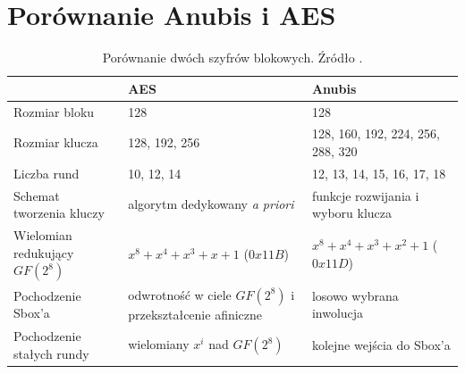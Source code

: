 \section{Porównanie Anubis i AES}

\begin{table}[!ht]
\centering
\begin{tabular}{ | L|| K| K |} 
\hline
 & AES & Anubis \\ 
\hline
\hline
Rozmiar bloku & 128 & 128 \\ 
\hline
Rozmiar klucza & 128, 192, 256 & 128, 160, 192, 224, 256, 288, 320 \\ 
\hline
Liczba rund & 10, 12, 14 & 12, 13, 14, 15, 16, 17, 18 \\ 
\hline
Schemat tworzenia kluczy & algorytm dedykowany \textit{a priori} & funkcje rozwijania i wyboru klucza \\ 
\hline
Wielomian redukujący $GF(2^8)$ & $x^8+x^4+x^3+x+1$ ($0x11B$) & $x^8+x^4+x^3+x^2+1$ ($0x11D$)\\ 
\hline
Pochodzenie Sbox'a & odwrotność w ciele $GF(2^8)$ i przekształcenie afiniczne & losowo wybrana inwolucja\\ 
\hline
Pochodzenie stałych rundy & wielomiany $x^i$ nad $GF(2^8)$ & kolejne wejścia do Sbox'a\\ 
\hline
\end{tabular}
\caption{\label{tab:comparison}Porównanie dwóch szyfrów blokowych. Źródło  \cite{strona_anubis}.}
\end{table}    

